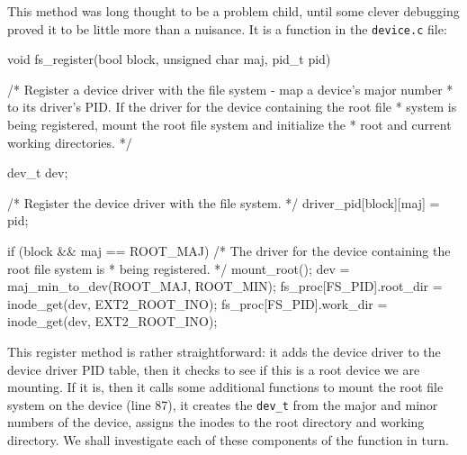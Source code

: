 This method was long thought to be a problem child, until some clever debugging proved it to be little more than a nuisance. It is a function in the \verb|device.c| file: 
\begin{code}[numbers=left,firstnumber=70,label={[Beginning of /brainix/src/fs/super.c]End of /brainix/src/fs/device.c}]
 void fs_register(bool block, unsigned char maj, pid_t pid)
 {
 
 /* Register a device driver with the file system - map a device's major number
  * to its driver's PID.  If the driver for the device containing the root file
  * system is being registered, mount the root file system and initialize the
  * root and current working directories. */

      dev_t dev;
 
      /* Register the device driver with the file system. */
      driver_pid[block][maj] = pid;
 
      if (block && maj == ROOT_MAJ)
      {
           /* The driver for the device containing the root file system is
            * being registered. */
           mount_root();
           dev = maj_min_to_dev(ROOT_MAJ, ROOT_MIN);
           fs_proc[FS_PID].root_dir = inode_get(dev, EXT2_ROOT_INO);
           fs_proc[FS_PID].work_dir = inode_get(dev, EXT2_ROOT_INO);
      }
 }
\end{code}
This register method is rather straightforward: it adds the device driver to the device driver PID table, then it checks to see if this is a root device we are mounting. If it is, then it calls some additional functions to mount the root file system on the device (line 87), it creates the \verb|dev_t| from the major and minor numbers of the device, assigns the inodes to the root directory and working directory. We shall investigate each of these components of the function in turn.

